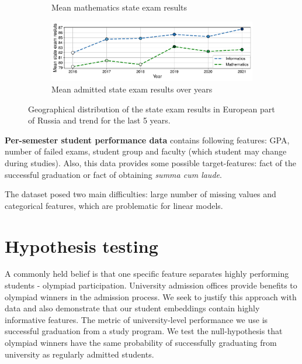 \documentclass{article}
\begin{document}
\begin{figure}[t!]
\begin{subfigure}{0.49\textwidth}
    \caption{Mean mathematics state exam results}
    \label{fig:mapmath}
  \end{subfigure}
  \begin{subfigure}{0.9\textwidth}
    \includegraphics[width=\linewidth]{../gfx/ege_trend.pdf}
    \caption{Mean admitted state exam results over years}
    \label{fig:egetrend}
  \end{subfigure}\hfil
  \captionsetup{belowskip=-10pt}
  \caption{Geographical distribution of the state exam results in European part of Russia and trend for the last 5 years.}
\end{figure}

\textbf{Per-semester student performance data} contains following features: GPA, number of failed exams, student group and faculty (which student may change during studies). Also, this data provides some possible target-features: fact of the successful graduation or fact of obtaining \textit{summa cum laude}.


The dataset posed two main difficulties: large number of missing values and categorical features, which are problematic for linear models.



\section{Hypothesis testing}
\label{sec:hypothesis}
A commonly held belief is that one specific feature separates highly performing students - olympiad participation.
University admission offices provide benefits to olympiad winners in the admission process.
We seek to justify this approach with data and also demonstrate that our student embeddings contain highly informative features. The metric of university-level performance we use is successful graduation from a study program. We test the null-hypothesis that olympiad winners have the same probability of successfully graduating from university as regularly admitted students.
\end{document}
